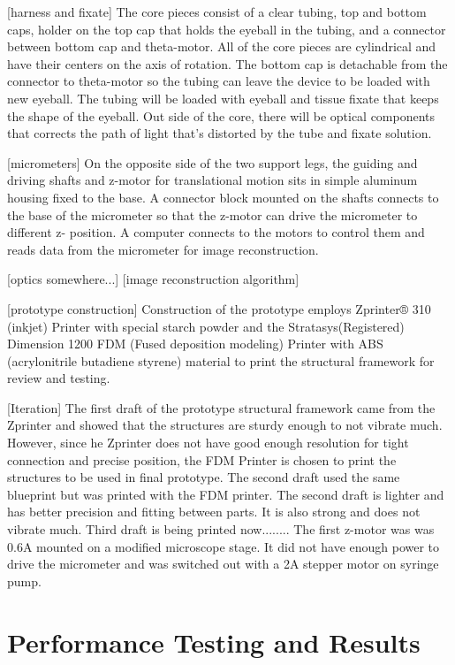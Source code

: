 \documentclass{article}
\begin{document}
[harness and fixate]
	The core pieces consist of a clear tubing, top and bottom caps, holder on the top cap that holds 
the eyeball in the tubing, and a connector between bottom cap and theta-motor. All of the core pieces are 
cylindrical and have their centers on the axis of rotation. The bottom cap is detachable from the connector 
to theta-motor so the tubing can leave the device to be loaded with new eyeball. The tubing will be loaded 
with eyeball and tissue fixate that keeps the shape of the eyeball. Out side of the core, there will be optical 
components that corrects the path of light that's distorted by the tube and fixate solution.

[micrometers]
	On the opposite side of the two support legs, the guiding and driving shafts and z-motor for 
translational motion sits in simple aluminum housing fixed to the base. A connector block mounted on the 
shafts connects to the base of the micrometer so that the z-motor can drive the micrometer to different z-
position. A computer connects to the motors to control them and reads data from the micrometer for image 
reconstruction. 
	
[optics somewhere...]
[image reconstruction algorithm]

[prototype construction]
	Construction of the prototype employs Zprinter® 310 (inkjet) Printer with special starch powder 
and the Stratasys(Registered) Dimension 1200 FDM (Fused deposition modeling) Printer with ABS 
(acrylonitrile butadiene styrene) material to print the structural framework for review and testing.

[Iteration]
	The first draft of the prototype structural framework came from the Zprinter and showed that the 
structures are sturdy enough to not vibrate much. However, since he Zprinter does not have good enough 
resolution for tight connection and precise position, the FDM Printer is chosen to print the structures to be 
used in final prototype. The second draft used the same blueprint but was printed with the FDM printer. The 
second draft is lighter and has better precision and fitting between parts. It is also strong and does not 
vibrate much.  Third draft is being printed now........
	The first z-motor was was 0.6A mounted on a modified microscope stage. It did not have enough 
power to drive the micrometer and was switched out with a 2A stepper motor on syringe pump.


\section{Performance Testing and Results}
\label{sec:perf-test-results}
\end{document}

